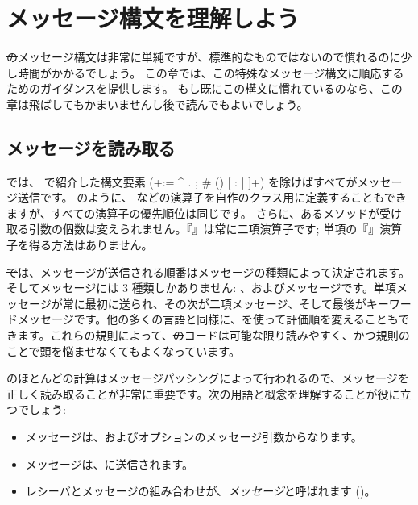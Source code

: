 \documentclass[a4paper,10pt,twoside]{book}
\begin{document}
	\renewcommand{\nnbb}[2]{} %
	\sloppy
\fi
\chapter{メッセージ構文を理解しよう}

\st のメッセージ構文は非常に単純ですが、標準的なものではないので慣れるのに少し時間がかかるでしょう。
この章では、この特殊なメッセージ構文に順応するためのガイダンスを提供します。
もし既にこの構文に慣れているのなら、この章は飛ばしてもかまいませんし後で読んでもよいでしょう。

\section{メッセージを読み取る}

\st では、 で紹介した構文要素 (\ct+:= ^ . ; # () {} [ : | ]+) を除けばすべてがメッセージ送信です。
 のように、\ct{+} などの演算子を自作のクラス用に定義することもできますが、すべての演算子の優先順位は同じです。
さらに、あるメソッドが受け取る引数の個数は変えられません。『\ct{-}』は常に二項演算子です; 単項の『\ct{-}』演算子を得る方法はありません。

\st では、メッセージが送信される順番はメッセージの種類によって決定されます。そしてメッセージには 3 種類しかありません: 、およびメッセージです。単項メッセージが常に最初に送られ、その次が二項メッセージ、そして最後がキーワードメッセージです。他の多くの言語と同様に、を使って評価順を変えることもできます。これらの規則によって、\st のコードは可能な限り読みやすく、かつ規則のことで頭を悩ませなくてもよくなっています。

\st のほとんどの計算はメッセージパッシングによって行われるので、メッセージを正しく読み取ることが非常に重要です。次の用語と概念を理解することが役に立つでしょう:

\begin{itemize}
  \item メッセージは、およびオプションのメッセージ引数からなります。
  \item メッセージは、に送信されます。
  \item レシーバとメッセージの組み合わせが、\emph{メッセージ}と呼ばれます ()。
\end{itemize}
\end{document}
